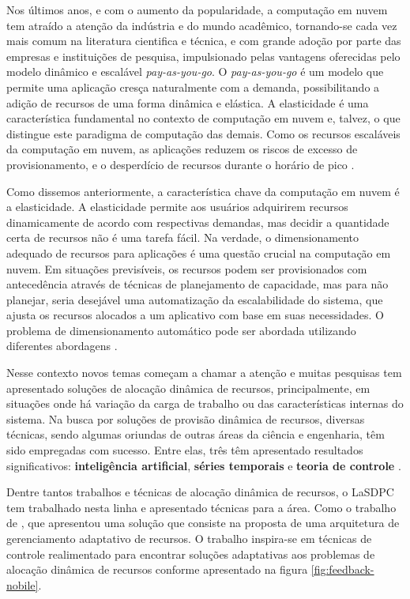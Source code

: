 Nos últimos anos, e com o aumento da popularidade, a computação em nuvem tem atraído a atenção da indústria e do mundo acadêmico, tornando-se cada vez mais comum na literatura cientifica e técnica, e com grande adoção por parte das empresas e instituições de pesquisa, impulsionado pelas vantagens oferecidas pelo modelo dinâmico e escalável \textit{pay-as-you-go}. O \textit{pay-as-you-go} é um modelo que permite uma aplicação cresça naturalmente com a demanda, possibilitando a adição de recursos de uma forma dinâmica e elástica. A elasticidade é uma característica fundamental no contexto de computação em nuvem e, talvez, o que distingue este paradigma de computação das demais. Como os recursos escaláveis da computação em nuvem, as aplicações reduzem os riscos de excesso de provisionamento, e o desperdício de recursos durante o horário de pico \cite{vazquez2014, galante2012}.

Como dissemos anteriormente, a característica chave da computação em nuvem é a elasticidade. A elasticidade permite aos usuários adquirirem recursos dinamicamente de acordo com respectivas demandas, mas decidir a quantidade certa de recursos não é uma tarefa fácil. Na verdade, o dimensionamento adequado de recursos para aplicações é uma questão crucial na computação em nuvem. Em situações previsíveis, os recursos podem ser provisionados com antecedência através de técnicas de planejamento de capacidade, mas para não planejar, seria desejável uma automatização da escalabilidade do sistema, que ajusta os recursos alocados a um aplicativo com base em suas necessidades. O problema de dimensionamento automático pode ser abordada utilizando diferentes abordagens \cite{Tania2012}.  

Nesse contexto novos temas começam a chamar a atenção e muitas pesquisas tem apresentado soluções de alocação dinâmica de recursos, principalmente, em situações onde há variação da carga de trabalho ou das características internas do sistema. 
Na busca por soluções de provisão dinâmica de recursos, diversas técnicas, sendo algumas oriundas de outras áreas da ciência e engenharia, têm sido empregadas com sucesso. Entre elas, três têm apresentado resultados significativos: \textbf{inteligência artificial}, \textbf{séries temporais} e \textbf{teoria de controle} \cite{Nobile2013}.

Dentre tantos trabalhos e técnicas de alocação dinâmica de recursos, o LaSDPC tem trabalhado nesta linha e apresentado técnicas para a área. Como o trabalho de \cite{Nobile2013}, que apresentou uma solução que consiste na proposta de uma arquitetura de gerenciamento adaptativo de recursos. O trabalho inspira-se em técnicas de controle realimentado para encontrar soluções adaptativas aos problemas de alocação dinâmica de recursos conforme apresentado na figura \ref{fig:feedback-nobile}.

